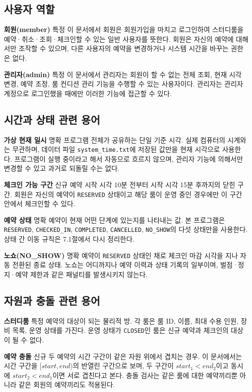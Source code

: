 \documentclass[a4paper,10pt]{article}
\begin{document}
\subsection{사용자 역할}
\textbf{회원(member)} 특정 이 문서에서 회원은 회원가입을 마치고 로그인하여 스터디룸을 예약·취소·조회·체크인할 수 있는 일반 사용자를 뜻한다. 회원은 자신의 예약에 대해서만 조작할 수 있으며, 다른 사용자의 예약을 변경하거나 시스템 시간을 바꾸는 권한은 없다.

\textbf{관리자(admin)} 특정 이 문서에서 관리자는 회원이 할 수 없는 전체 조회, 현재 시각 변경, 예약 조정, 룸 컨디션 관리 기능을 수행할 수 있는 사용자이다. 관리자는 관리자 계정으로 로그인했을 때에만 이러한 기능에 접근할 수 있다.

\subsection{시간과 상태 관련 용어}
\textbf{가상 현재 일시} 명확 프로그램 전체가 공유하는 단일 기준 시각. 실제 컴퓨터의 시계와는 무관하며, 데이터 파일 \texttt{system\_time.txt}에 저장된 값만을 현재 시각으로 사용한다. 프로그램이 실행 중이라고 해서 자동으로 흐르지 않으며, 관리자 기능에 의해서만 변경할 수 있고 과거로 되돌릴 수는 없다.

\textbf{체크인 가능 구간} 신규 예약 시작 시각 10분 전부터 시작 시각 15분 후까지의 닫힌 구간. 회원은 자신의 예약이 \texttt{RESERVED} 상태이고 해당 룸이 운영 중인 경우에만 이 구간 안에서 체크인할 수 있다.

\textbf{예약 상태} 명확 예약이 현재 어떤 단계에 있는지를 나타내는 값. 본 프로그램은 \texttt{RESERVED}, \texttt{CHECKED\_IN}, \texttt{COMPLETED}, \texttt{CANCELLED}, \texttt{NO\_SHOW}의 다섯 상태만을 사용한다. 상태 간 이동 규칙은 7.1절에서 다시 정리한다.

\textbf{노쇼(NO\_SHOW)} 명확 예약이 \texttt{RESERVED} 상태인 채로 체크인 마감 시각을 지나 자동 전환된 종료 상태. 노쇼는 어디까지나 예약 이력과 상태 기록의 일부이며, 벌점·정지·예약 제한과 같은 패널티를 발생시키지 않는다.

\subsection{자원과 충돌 관련 용어}
\textbf{스터디룸} 특정 예약의 대상이 되는 물리적 방. 각 룸은 룸 ID, 이름, 최대 수용 인원, 장비 목록, 운영 상태를 가진다. 운영 상태가 \texttt{CLOSED}인 룸은 신규 예약과 체크인의 대상이 될 수 없다.

\textbf{예약 충돌} 신규 두 예약의 시간 구간이 같은 자원 위에서 겹치는 경우. 이 문서에서는 시간 구간을 \([start, end)\)의 반열린 구간으로 보며, 두 구간이 \(start_1 < end_2\)이고 동시에 \(start_2 < end_1\)이면 서로 겹친다고 본다. 충돌 검사는 같은 룸에 대한 예약끼리뿐 아니라 같은 회원의 예약끼리도 적용된다.
\end{document}
